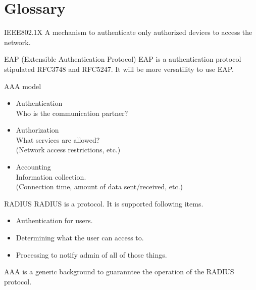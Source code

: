 \section{Glossary}
\toc
\begin{frame}[c]{\fft}
    \begin{block}{IEEE802.1X}
        A mechanism to authenticate only authorized devices to access the network.
    \end{block}
    \vfill
    \begin{block}{EAP (Extensible Authentication Protocol)}
        EAP is a authentication protocol stipulated {{RFC3748}} and {{RFC5247}}.
        It will be more versatility to use EAP.
    \end{block}
\end{frame}
\begin{frame}[c]{\fft}
    \begin{block}{AAA model}
        \begin{itemize}
            \item {\large A}uthentication\\
                  Who is the communication partner?
            \item {\large A}uthorization\\
                  What services are allowed?\\(Network access restrictions, etc.)
            \item {\large A}ccounting\\
                  Information collection.\\
                  (Connection time, amount of data sent/received, etc.)
        \end{itemize}
    \end{block}
\end{frame}
\begin{frame}[c]{\fft}
    \begin{block}{RADIUS}
        RADIUS is a protocol. It is supported following items.
        \begin{itemize}
            \item Authentication for users.
            \item Determining what the user can access to.
            \item Processing to notify admin of all of those things.
        \end{itemize}
        AAA is a generic background to guaranntee the operation of the RADIUS protocol.
    \end{block}
\end{frame}